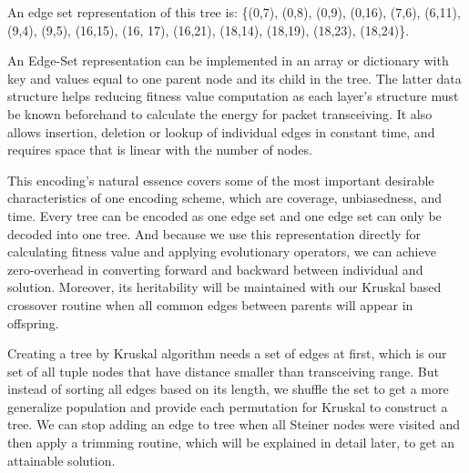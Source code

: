 \noindent{}

An edge set representation of this tree is: \{(0,7), (0,8), (0,9), (0,16), (7,6), (6,11), (9,4), (9,5), (16,15), (16, 17), (16,21), (18,14), (18,19), (18,23), (18,24)\}.

An Edge-Set representation can be implemented in an array or dictionary with key and values equal to one parent node and its child in the tree. The latter data structure helps reducing fitness value computation as each layer’s structure must be known beforehand to calculate the energy for packet transceiving. It also allows insertion, deletion or lookup of individual edges in constant time, and requires space that is linear with the number of nodes.

This encoding’s natural essence covers some of the most important desirable characteristics of one encoding scheme, which are coverage, unbiasedness, and time. Every tree can be encoded as one edge set and one edge set can only be decoded into one tree. And because we use this representation directly for calculating fitness value and applying evolutionary operators, we can achieve zero-overhead in converting forward and backward between individual and solution. Moreover, its heritability will be maintained with our Kruskal based crossover routine when all common edges between parents will appear in offspring.

Creating a tree by Kruskal algorithm needs a set of edges at first, which is our set of all tuple nodes that have distance smaller than transceiving range. But instead of sorting all edges based on its length, we shuffle the set to get a more generalize population and provide each permutation for Kruskal to construct a tree. We can stop adding an edge to tree when all Steiner nodes were visited and then apply a trimming routine, which will be explained in detail later, to get an attainable solution.


